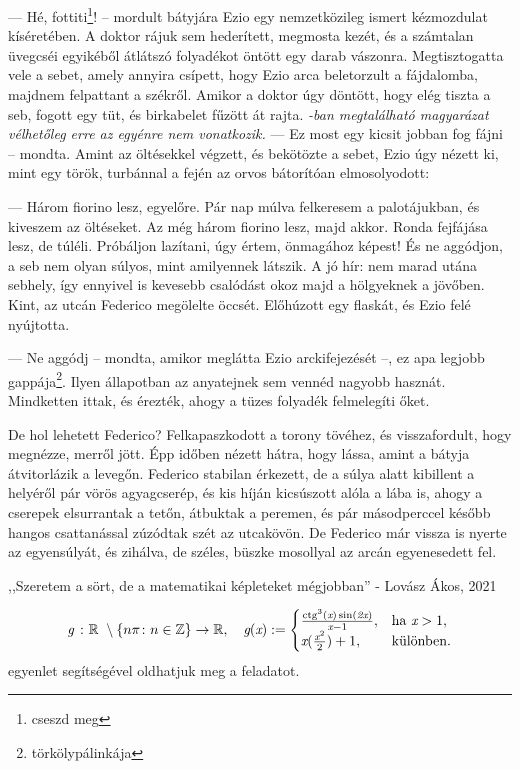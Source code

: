 \documentclass{thesis-ekf}
\DeclareMathOperator{\ctg}{ctg}
\theoremstyle{definition}
\theoremstyle{remark}
\begin{document}
— Hé,  fottiti\footnote{cseszd meg}!  -- mordult  bátyjára  Ezio  egy  nemzetközileg  ismert 
kézmozdulat kíséretében. 
A doktor rájuk sem  hederített, megmosta kezét, és a  számtalan 
üvegcséi  egyikéből  átlátszó  folyadékot öntött  egy  darab  vászonra. 
Megtisztogatta vele a sebet, amely annyira csípett, hogy Ezio arca 
beletorzult  a  fájdalomba,  majdnem  felpattant  a székről.  Amikor  a 
doktor  úgy  döntött,  hogy  elég  tiszta  a  seb,  fogott  egy  tüt,  és 
birkabelet fűzött át rajta. \emph{\Az{\ref{definicio}}-ban megtalálható magyarázat vélhetőleg erre az egyénre nem vonatkozik.}
— Ez  most  egy  kicsit  jobban  fog  fájni  --  mondta.  Amint  az 
öltésekkel végzett, és bekötözte a sebet, Ezio úgy nézett ki, mint egy 
török, turbánnal a fején az orvos bátorítóan elmosolyodott: 

— Három  fiorino  lesz,  egyelőre.  Pár  nap  múlva  felkeresem  a 
palotájukban, és kiveszem az öltéseket. Az még három fiorino lesz, 
majd akkor. Ronda fejfájása lesz, de túléli. Próbáljon lazítani, úgy 
értem, önmagához képest! És ne aggódjon, a seb nem olyan súlyos, 
mint amilyennek  látszik.  A  jó  hír:  nem  marad  utána sebhely,  így 
ennyivel is kevesebb csalódást okoz majd a hölgyeknek a jövőben. 
Kint, az utcán Federico megölelte öccsét. Előhúzott egy flaskát, és 
Ezio felé nyújtotta. 

— Ne aggódj -- mondta, amikor meglátta Ezio arckifejezését --, ez 
apa  legjobb  gappája\footnote{törkölypálinkája}.  Ilyen  állapotban  az  anyatejnek  sem  vennéd 
nagyobb hasznát. 
Mindketten ittak, és érezték, ahogy a tüzes folyadék felmelegíti 
őket.\cite{BERNE}

De  hol  lehetett  Federico?  Felkapaszkodott  a torony  tövéhez,  és 
visszafordult, hogy megnézze, merről jött. Épp időben nézett hátra, 
hogy lássa, amint a bátyja átvitorlázik a levegőn. Federico stabilan 
érkezett, de a súlya alatt kibillent a helyéről pár vörös agyagcserép, 
és kis híján kicsúszott alóla a lába is, ahogy a cserepek elsurrantak a 
tetőn,  átbuktak  a  peremen,  és  pár  másodperccel  később  hangos 
csattanással zúzódtak szét az utcakövön. De Federico már vissza is 
nyerte  az  egyensúlyát,  és  zihálva,  de  széles,  büszke  mosollyal  az 
arcán egyenesedett fel.

,,Szeretem a sört, de a matematikai képleteket mégjobban'' - Lovász Ákos, 2021
\smallskip

\begin{equation} \label{keplet}
    \emph{g}\ \colon\mathbb{R}\ \setminus
    \left\{n\pi \colon n \in\mathbb{Z}\right\}\to\mathbb{R},\quad
    \emph{g}(\emph{x}):=
    \begin{cases}
        \frac{\ctg^3(\emph{x})\sin(\emph{2x})}{\emph{x}-1},&\text{ha }\emph{x} > 1,\\
        \emph{x}(\frac{\emph{x}^2}2)+1,&\text{különben}.
    \end{cases}
    \end{equation}\cite[A képlet forrása]{TomacsTibor}
    \Az{\eqref{keplet}} egyenlet segítségével oldhatjuk meg a feladatot.
\end{document}
